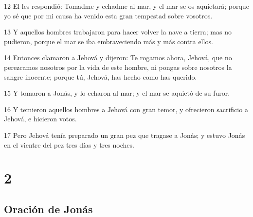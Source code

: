 \par 12 El les respondió: Tomadme y echadme al mar, y el mar se os aquietará; porque yo sé que por mi causa ha venido esta gran tempestad sobre vosotros. 
\par 13 Y aquellos hombres trabajaron para hacer volver la nave a tierra; mas no pudieron, porque el mar se iba embraveciendo más y más contra ellos.
\par 14 Entonces clamaron a Jehová y dijeron: Te rogamos ahora, Jehová, que no perezcamos nosotros por la vida de este hombre, ni pongas sobre nosotros la sangre inocente; porque tú, Jehová, has hecho como has querido.
\par 15 Y tomaron a Jonás, y lo echaron al mar; y el mar se aquietó de su furor.
\par 16 Y temieron aquellos hombres a Jehová con gran temor, y ofrecieron sacrificio a Jehová, e hicieron votos.
\par 17 Pero Jehová tenía preparado un gran pez que tragase a Jonás; y estuvo Jonás en el vientre del pez tres días y tres noches. 

\chapter{2}

\section*{Oración de Jonás}


